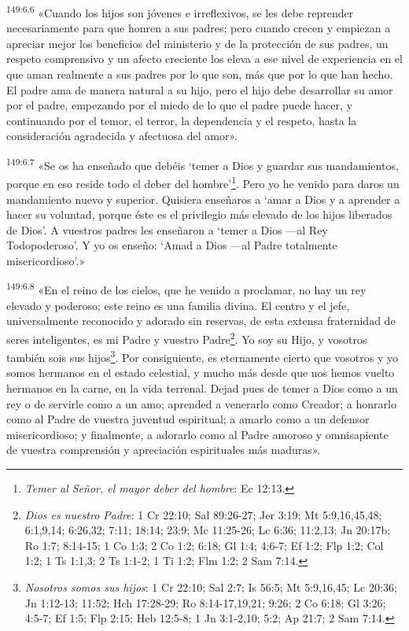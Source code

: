 \par
\textsuperscript{149:6.6} «Cuando los hijos son jóvenes e irreflexivos, se les debe reprender necesariamente para que honren a sus padres; pero cuando crecen y empiezan a apreciar mejor los beneficios del ministerio y de la protección de sus padres, un respeto comprensivo y un afecto creciente los eleva a ese nivel de experiencia en el que aman realmente a sus padres por lo que son, más que por lo que han hecho. El padre ama de manera natural a su hijo, pero el hijo debe desarrollar su amor por el padre, empezando por el miedo de lo que el padre puede hacer, y continuando por el temor, el terror, la dependencia y el respeto, hasta la consideración agradecida y afectuosa del amor».

\par
\textsuperscript{149:6.7} «Se os ha enseñado que debéis `temer a Dios y guardar sus mandamientos, porque en eso reside todo el deber del hombre'\footnote{\textit{Temer al Señor, el mayor deber del hombre}: Ec 12:13.}. Pero yo he venido para daros un mandamiento nuevo y superior. Quisiera enseñaros a `amar a Dios y a aprender a hacer su voluntad, porque éste es el privilegio más elevado de los hijos liberados de Dios'. A vuestros padres les enseñaron a `temer a Dios ---al Rey Todopoderoso'. Y yo os enseño: `Amad a Dios ---al Padre totalmente misericordioso'.»

\par
\textsuperscript{149:6.8} «En el reino de los cielos, que he venido a proclamar, no hay un rey elevado y poderoso; este reino es una familia divina. El centro y el jefe, universalmente reconocido y adorado sin reservas, de esta extensa fraternidad de seres inteligentes, es mi Padre y vuestro Padre\footnote{\textit{Dios es nuestro Padre}: 1 Cr 22:10; Sal 89:26-27; Jer 3:19; Mt 5:9,16,45,48; 6:1,9,14; 6:26,32; 7:11; 18:14; 23:9; Mc 11:25-26; Lc 6:36; 11:2,13; Jn 20:17b; Ro 1:7; 8:14-15; 1 Co 1:3; 2 Co 1:2; 6:18; Gl 1:4; 4:6-7; Ef 1:2; Flp 1:2; Col 1:2; 1 Ts 1:1,3; 2 Ts 1:1-2; 1 Ti 1:2; Flm 1:2; 2 Sam 7:14.}. Yo soy su Hijo, y vosotros también sois sus hijos\footnote{\textit{Nosotros somos sus hijos}: 1 Cr 22:10; Sal 2:7; Is 56:5; Mt 5:9,16,45; Lc 20:36; Jn 1:12-13; 11:52; Hch 17:28-29; Ro 8:14-17,19,21; 9:26; 2 Co 6:18; Gl 3:26; 4:5-7; Ef 1:5; Flp 2:15; Heb 12:5-8; 1 Jn 3:1-2,10; 5:2; Ap 21:7; 2 Sam 7:14.}. Por consiguiente, es eternamente cierto que vosotros y yo somos hermanos en el estado celestial, y mucho más desde que nos hemos vuelto hermanos en la carne, en la vida terrenal. Dejad pues de temer a Dios como a un rey o de servirle como a un amo; aprended a venerarlo como Creador; a honrarlo como al Padre de vuestra juventud espiritual; a amarlo como a un defensor misericordioso; y finalmente, a adorarlo como al Padre amoroso y omnisapiente de vuestra comprensión y apreciación espirituales más maduras».

